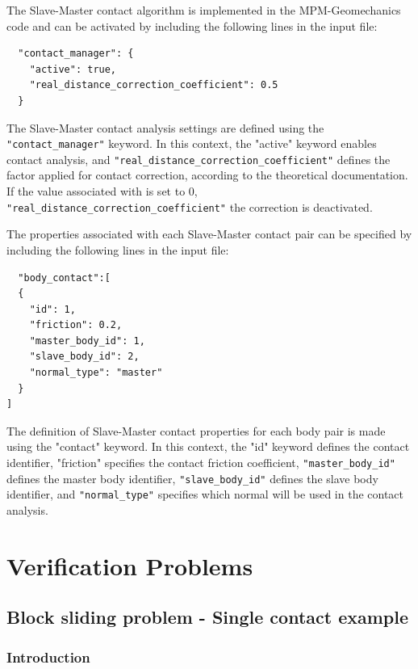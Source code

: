 The Slave-Master contact algorithm is implemented in the MPM-Geomechanics code and can be activated 
by including the following lines in the input file:

\begin{lstlisting}    
  "contact_manager": {
    "active": true,
    "real_distance_correction_coefficient": 0.5
  }
\end{lstlisting}
The Slave-Master contact analysis settings are defined using the \verb|"contact_manager"| keyword. In this context,
the "active" keyword enables contact analysis, and \verb|"real_distance_correction_coefficient"| defines the factor applied 
for contact correction, according to the theoretical documentation. If the value associated with  is set to 0, 
\verb|"real_distance_correction_coefficient"| the correction is deactivated.

The properties associated with each Slave-Master contact pair can be specified by including the following lines in the input file:

\begin{lstlisting}
  "body_contact":[
  {
    "id": 1,
    "friction": 0.2,
    "master_body_id": 1,
    "slave_body_id": 2,
    "normal_type": "master"
  }
]
\end{lstlisting}

The definition of Slave-Master contact properties for each body pair is made using the "contact" keyword. In this context, the "id"
keyword defines the contact identifier, "friction" specifies the contact friction coefficient, \verb|"master_body_id"| defines the master body 
identifier, \verb|"slave_body_id"| defines the slave body identifier, and \verb|"normal_type"| specifies which normal will be used in the contact analysis.

\section{Verification Problems}
\label{sec:verification_problems}

\subsection{Block sliding problem - Single contact example}
\label{sec:block_sliding_Slave-Master_contact_example}

\subsubsection*{Introduction}

